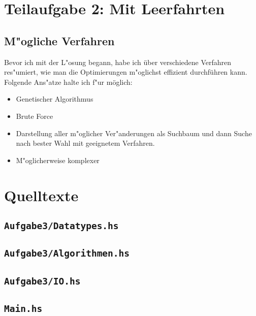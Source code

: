 \documentclass{scrreprt}
\begin{document}
\chapter{Teilaufgabe 2: Mit Leerfahrten}

\section{M"ogliche Verfahren}
Bevor ich mit der L"osung begann, habe ich über verschiedene Verfahren
res"umiert, wie man die Optimierungen m"oglichst effizient durchführen kann.
Folgende Ans"atze halte ich f"ur möglich:

\begin{itemize}
\item Genetischer Algorithmus
\item Brute Force
\item Darstellung aller m"oglicher Ver"anderungen als Suchbaum und dann Suche
nach bester Wahl mit geeignetem Verfahren.
\item M"oglicherweise komplexer
\end{itemize}

\chapter{Quelltexte}

\section{\texttt{Aufgabe3/Datatypes.hs}}


\section{\texttt{Aufgabe3/Algorithmen.hs}}


\section{\texttt{Aufgabe3/IO.hs}}


\section{\texttt{Main.hs}}

\end{document}
